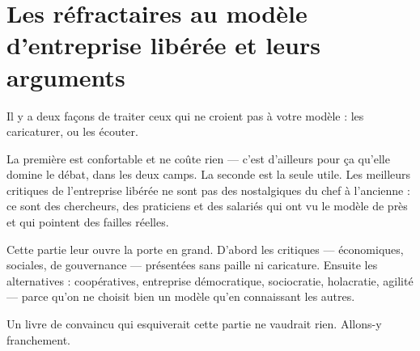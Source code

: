 \part{Les réfractaires au modèle d'entreprise libérée et leurs arguments}

Il y a deux façons de traiter ceux qui ne croient pas à votre modèle : les caricaturer, ou les écouter.

La première est confortable et ne coûte rien — c'est d'ailleurs pour ça qu'elle domine le débat, dans les deux camps. La seconde est la seule utile. Les meilleurs critiques de l'entreprise libérée ne sont pas des nostalgiques du chef à l'ancienne : ce sont des chercheurs, des praticiens et des salariés qui ont vu le modèle de près et qui pointent des failles réelles.

Cette partie leur ouvre la porte en grand. D'abord les critiques — économiques, sociales, de gouvernance — présentées sans paille ni caricature. Ensuite les alternatives : coopératives, entreprise démocratique, sociocratie, holacratie, agilité — parce qu'on ne choisit bien un modèle qu'en connaissant les autres.

Un livre de convaincu qui esquiverait cette partie ne vaudrait rien. Allons-y franchement.
